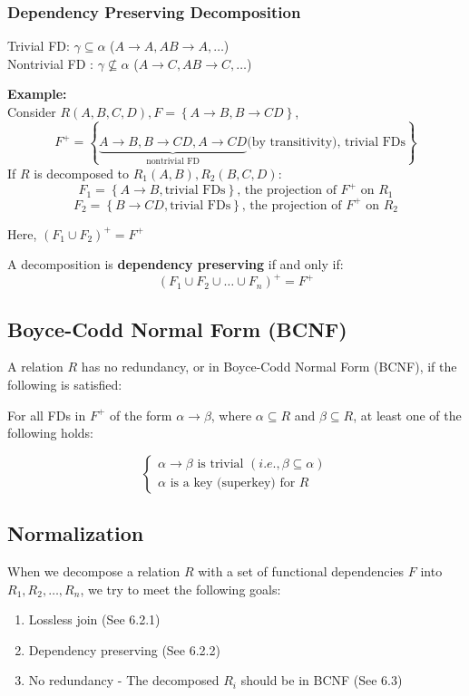 \documentclass[11pt,a4paper]{article}
\begin{document}
\subsubsection{Dependency Preserving Decomposition}
Trivial FD: $\gamma \subseteq \alpha$ ($A \rightarrow A, AB \rightarrow A, \dots $) \\
Nontrivial FD : $\gamma \nsubseteq \alpha $ ($A \rightarrow C, AB \rightarrow C, \dots $) \par

\textbf{Example:} \\
Consider $R(A, B, C, D), F = \left\{A \rightarrow B, B \rightarrow CD\right\}$,
\[
F^+ = \left\{\underbrace{A \rightarrow B, B \rightarrow CD, A \rightarrow CD}_{\text{nontrivial FD}} \text{(by transitivity), trivial FDs}\right\}
\]
If $R$ is decomposed to $R_1(A, B), R_2(B, C, D)$:
\[
F_1 = \left\{A \rightarrow B, \text{trivial FDs} \right\} \text{, the projection of $F^+$ on $R_1$}
\]
\[
F_2 = \left\{B \rightarrow CD, \text{trivial FDs} \right\} \text{, the projection of $F^+$ on $R_2$}
\]

Here, $(F_1 \cup F_2)^+ = F^+$ \par


A decomposition is \textbf{dependency preserving} if and only if:
\[
(F_1 \cup F_2 \cup \dots \cup F_n)^+ = F^+
\]

\subsection{Boyce-Codd Normal Form (BCNF)}
A relation $R$ has no redundancy, or in Boyce-Codd Normal Form (BCNF), if the following is satisfied: \par
For all FDs in $F^+$ of the form $\alpha \rightarrow \beta$, where $\alpha \subseteq R$ and $\beta \subseteq R$, at least one of the following holds: \par
\[
\begin{cases}
    \alpha \rightarrow \beta \text{ is trivial } (i.e., \beta \subseteq \alpha) \\
    \alpha \text{ is a key (superkey) for } R
\end{cases}
\]

\subsection{Normalization}
When we decompose a relation $R$ with a set of functional dependencies $F$ into $R_1, R_2, \dots, R_n$, we try to meet the following goals:
\begin{enumerate}
    \item [1. ] Lossless join (See 6.2.1)
    \item [2. ] Dependency preserving (See 6.2.2)
    \item [3. ] No redundancy - The decomposed $R_i$ should be in BCNF (See 6.3)
\end{enumerate}
\end{document}
